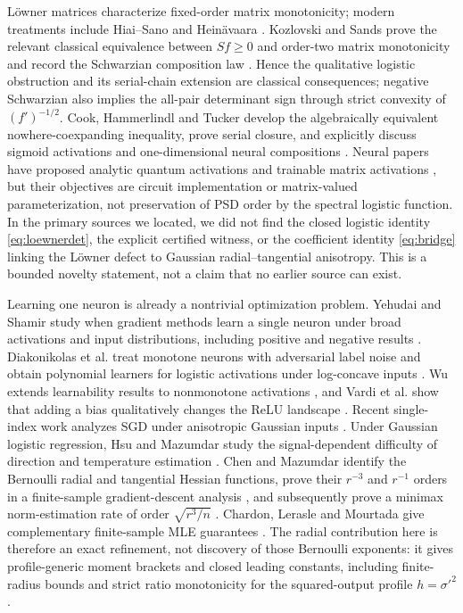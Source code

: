 \documentclass[11pt]{article}
\begin{document}
L\"owner matrices characterize fixed-order matrix monotonicity; modern treatments include Hiai--Sano and
Hein\"avaara \cite{hiai2010,heinavaara2019}.  Kozlovski and Sands prove the relevant classical equivalence between
$Sf\ge0$ and order-two matrix monotonicity and record the Schwarzian composition law
\cite{kozlovski2008}.  Hence the qualitative logistic obstruction and its serial-chain extension are classical
consequences; negative Schwarzian also implies the all-pair determinant sign through strict convexity of
$(f')^{-1/2}$.  Cook, Hammerlindl and Tucker develop the algebraically equivalent nowhere-coexpanding inequality,
prove serial closure, and explicitly discuss sigmoid activations and one-dimensional neural compositions
\cite{cook2023}.  Neural papers have proposed analytic
quantum activations and trainable matrix activations \cite{maronese2022,liu2021}, but their objectives are circuit
implementation or matrix-valued parameterization, not preservation of PSD order by the spectral logistic function.
In the primary sources we located, we did not find the closed logistic identity \eqref{eq:loewnerdet}, the explicit
certified witness, or the coefficient identity \eqref{eq:bridge} linking the L\"owner defect to Gaussian
radial--tangential anisotropy.  This is a bounded novelty statement, not a claim that no earlier source can exist.

Learning one neuron is already a nontrivial optimization problem.  Yehudai and Shamir study when gradient methods
learn a single neuron under broad activations and input distributions, including positive and negative results
\cite{yehudai2020}.  Diakonikolas et al. treat monotone neurons with adversarial label noise and obtain polynomial
learners for logistic activations under log-concave inputs \cite{diakonikolas2022}.  Wu extends learnability results to
nonmonotone activations \cite{wu2022}, and Vardi et al. show that adding a bias qualitatively changes the ReLU
landscape \cite{vardi2021}.  Recent single-index work analyzes SGD under anisotropic Gaussian inputs
\cite{braun2025}.  Under Gaussian logistic regression, Hsu and Mazumdar study the signal-dependent difficulty of
direction and temperature estimation \cite{hsu2024}.  Chen and Mazumdar identify the Bernoulli radial and
tangential Hessian functions, prove their $r^{-3}$ and $r^{-1}$ orders in a finite-sample gradient-descent analysis
\cite{chen2026gd}, and subsequently prove a minimax norm-estimation rate of order $\sqrt{r^3/n}$
\cite{chen2026minimax}.  Chardon, Lerasle and Mourtada give complementary finite-sample MLE guarantees
\cite{chardon2024}.  The radial contribution here is therefore an exact refinement, not discovery of those
Bernoulli exponents: it gives profile-generic moment brackets and closed leading constants, including finite-radius
bounds and strict ratio monotonicity for the squared-output profile $h=\sigma'^2$.
\end{document}
